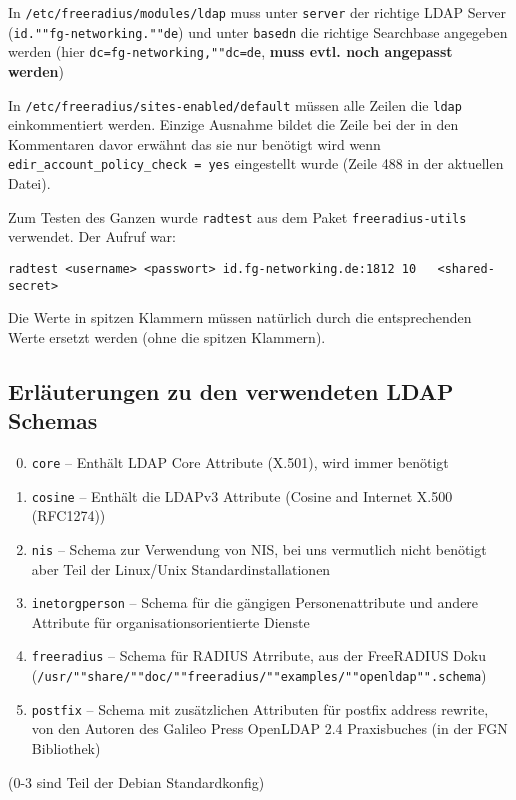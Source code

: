 In \texttt{/etc/freeradius/modules/ldap} muss unter \texttt{server} der richtige LDAP Server (\texttt{id.""fg-networking.""de}) und unter \texttt{basedn} die richtige Searchbase angegeben werden (hier \texttt{dc=fg-networking,""dc=de}, \textbf{muss evtl. noch angepasst werden})

In \texttt{/etc/freeradius/sites-enabled/default} müssen alle Zeilen die \texttt{ldap} einkommentiert werden. Einzige Ausnahme bildet die Zeile bei der in den Kommentaren davor erwähnt das sie nur benötigt wird wenn \texttt{edir\_account\_policy\_check = yes} eingestellt wurde (Zeile 488 in der aktuellen Datei).

Zum Testen des Ganzen wurde \texttt{radtest} aus dem Paket \texttt{freeradius-utils} verwendet. Der Aufruf war:
\begin{lstlisting}
radtest <username> <passwort> id.fg-networking.de:1812 10	<shared-secret>
\end{lstlisting}
Die Werte in spitzen Klammern müssen natürlich durch die entsprechenden Werte ersetzt werden (ohne die spitzen Klammern).



\subsection{Erläuterungen zu den verwendeten LDAP Schemas}\label{sec:LDAP-Schema}
\begin{enumerate}
\setcounter{enumi}{-1}
\item \texttt{core} -- Enthält LDAP Core Attribute (X.501), wird immer benötigt
\item \texttt{cosine} -- Enthält die LDAPv3 Attribute (Cosine and Internet X.500 (RFC1274))
\item \texttt{nis} -- Schema zur Verwendung von NIS, bei uns vermutlich nicht benötigt aber Teil der Linux/Unix Standardinstallationen
\item \texttt{inetorgperson} -- Schema für die gängigen Personenattribute und andere Attribute für organisationsorientierte Dienste
\item \texttt{freeradius} -- Schema für RADIUS Atrribute, aus der FreeRADIUS Doku (\texttt{/usr/""share/""doc/""freeradius/""examples/""openldap"".schema})
\item \texttt{postfix} -- Schema mit zusätzlichen Attributen für postfix address rewrite, von den Autoren des Galileo Press OpenLDAP 2.4 Praxisbuches (in der FGN Bibliothek)
\end{enumerate}
(0-3 sind Teil der Debian Standardkonfig)


